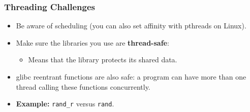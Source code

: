 \documentclass[aspectratio=43]{beamer}
\newenvironment{changemargin}[1]{%
  \begin{list}{}{%
    \setlength{\topsep}{0pt}%
    \setlength{\leftmargin}{#1}%
    \setlength{\rightmargin}{1em}
    \setlength{\listparindent}{\parindent}%
    \setlength{\itemindent}{\parindent}%
    \setlength{\parsep}{\parskip}%
  }%
  \item[]}{\end{list}}
\begin{document}
\begin{frame}
  \frametitle{Threading Challenges}

\begin{changemargin}{1.5cm}
  \begin{itemize}
    \item Be aware of scheduling (you can also set affinity with pthreads on
      Linux).
    \vfill
    \item Make sure the libraries you use are {\bf thread-safe}:
      \begin{itemize}
        \item Means that the library protects its shared data.
      \end{itemize}
    \vfill
    \item glibc reentrant functions are also safe: a program can have more than one
      thread calling these functions concurrently.
    \vfill
    \item {\bf Example:} {\tt rand\_r} versus
      {\tt rand}.
  \end{itemize}
\end{changemargin}

\end{frame}
\end{document}
